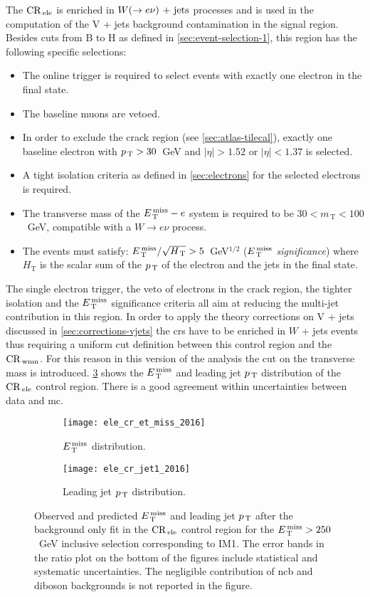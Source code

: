 The $\mathrm{CR}_\mathrm{\, ele}$ is enriched in $W (\rightarrow e \nu)\mathrm{~+~jets}$ processes and is used in the
computation of the V + jets background contamination in the signal
region. Besides cuts from B to H as defined in \cref{sec:event-selection-1},
this region has the following specific selections:
\begin{itemize}
\item The online trigger is required to select events with exactly one electron
  in the final state.
\item The baseline muons are vetoed.
\item In order to exclude the crack region (see \cref{sec:atlas-tilecal}),
  exactly one baseline electron with $p_\mathrm{\, T} > 30$~GeV and $|\eta| > 1.52$ or
  $|\eta| < 1.37$ is selected.
\item A tight isolation criteria as defined in \cref{sec:electrons} for the
  selected electrons is required.
\item The transverse mass of the $E_\mathrm{\, T}^\mathrm{\, miss} - e$ system is required to be
  $30 < m_\mathrm{\, T} < 100$~GeV, compatible with a $W \rightarrow e \nu$
  process.
\item The events must satisfy: $E_\mathrm{\, T}^\mathrm{\, miss}/\sqrt{H_\mathrm{\, T}} > 5$~GeV$^{1/2}$
  ($E_\mathrm{\, T}^\mathrm{\, miss}$ \emph{significance}) where $H_\mathrm{T}$ is the scalar sum of the
  $p_\mathrm{\, T}$ of the electron and the jets in the final state.
\end{itemize}
The single electron trigger, the veto of electrons in the crack region, the
tighter isolation and the $E_\mathrm{\, T}^\mathrm{\, miss}$ significance criteria all aim at reducing the
multi-jet contribution in this region. In order to apply the theory corrections
on V + jets discussed in \cref{sec:corrections-vjets} the \glspl{cr} have to be
enriched in $W$ + jets events thus requiring a uniform cut definition between
this control region and the $\mathrm{CR}_\mathrm{\, wmn}$. For this reason in this version of the
analysis the cut on the transverse mass is
introduced. \cref{fig:ele_cr_plots_2016} shows the $E_\mathrm{\, T}^\mathrm{\, miss}$ and leading jet $p_\mathrm{\, T}$
distribution of the $\mathrm{CR}_\mathrm{\, ele}$ control region. There is a good agreement within
uncertainties between data and \gls{mc}.
\begin{figure}[!th]
  \centering
  \begin{subfigure}[t]{.48\linewidth}
    \texttt{[image: ele\_cr\_et\_miss\_2016]}
    \caption{$E_\mathrm{\, T}^\mathrm{\, miss}$ distribution.}
    \label{fig:ele_cr_met}
  \end{subfigure}
  \begin{subfigure}[t]{.48\linewidth}
    \texttt{[image: ele\_cr\_jet1\_2016]}
    \caption{Leading jet $p_\mathrm{\, T}$ distribution.}
    \label{fig:ele_cr_jet1}
  \end{subfigure}
  \caption{Observed and predicted $E_\mathrm{\, T}^\mathrm{\, miss}$ and leading jet $p_\mathrm{\, T}$ after the
    background only fit in the $\mathrm{CR}_\mathrm{\, ele}$ control region for the $E_\mathrm{\, T}^\mathrm{\, miss} > 250$~GeV
    inclusive selection corresponding to IM1. The error bands in the ratio plot
    on the bottom of the figures include statistical and systematic
    uncertainties. The negligible contribution of \gls{ncb} and diboson
    backgrounds is not reported in the figure.}
  \label{fig:ele_cr_plots_2016}
\end{figure}
